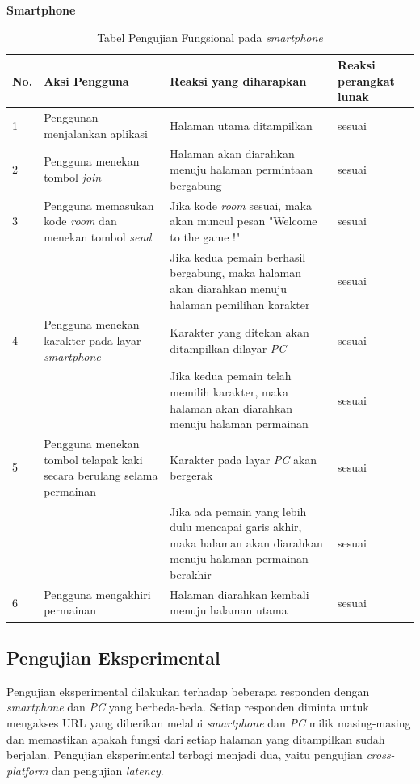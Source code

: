 \textbf{Smartphone} \\
\begin{table}[H]
	\centering
	\caption{Tabel Pengujian Fungsional pada \textit{smartphone}}
	\begin{tabular}{|p{0.35cm}| p{3.5cm}| p{7cm}| p{2.5cm}|} \hline
		No. & Aksi Pengguna & Reaksi yang diharapkan & Reaksi perangkat lunak \\ \hline
		1 & Penggunan menjalankan aplikasi & Halaman utama ditampilkan & sesuai \\ \hline 
		2 & Pengguna menekan tombol \textit{join} & Halaman akan diarahkan menuju halaman permintaan bergabung & sesuai \\ \hline
		3 & Pengguna memasukan kode \textit{room} dan menekan tombol \textit{send} & Jika kode \textit{room} sesuai, maka akan muncul pesan "Welcome to the game !" & sesuai \\ \hline
		& & Jika kedua pemain berhasil bergabung, maka halaman akan diarahkan menuju halaman pemilihan karakter & sesuai \\ \hline
		4 & Pengguna menekan karakter pada layar \textit{smartphone} & Karakter yang ditekan akan ditampilkan dilayar \textit{PC} & sesuai \\ \hline
		& & Jika kedua pemain telah memilih karakter, maka halaman akan diarahkan menuju halaman permainan & sesuai \\ \hline
		5 & Pengguna menekan tombol telapak kaki secara berulang selama permainan & Karakter pada layar \textit{PC} akan bergerak & sesuai\\ \hline
		& & Jika ada pemain yang lebih dulu mencapai garis akhir, maka halaman akan diarahkan menuju halaman permainan berakhir & sesuai \\ \hline
		6 & Pengguna mengakhiri permainan & Halaman diarahkan kembali menuju halaman utama & sesuai \\ \hline
	\end{tabular}
	\label{table:fungsionalSmartphone}
\end{table}
\subsection{Pengujian Eksperimental}
Pengujian eksperimental dilakukan terhadap beberapa responden dengan \textit{smartphone} dan \textit{PC} yang berbeda-beda. Setiap responden diminta untuk mengakses URL yang diberikan melalui \textit{smartphone} dan \textit{PC} milik masing-masing dan memastikan apakah fungsi dari setiap halaman yang ditampilkan sudah berjalan. Pengujian eksperimental terbagi menjadi dua, yaitu pengujian \textit{cross-platform} dan pengujian \textit{latency}.

